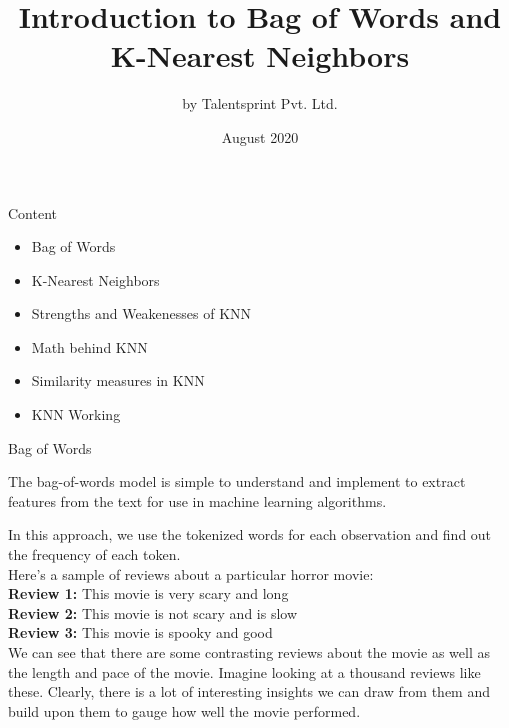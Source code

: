\documentclass{beamer}
\title{Introduction to Bag of Words and K-Nearest Neighbors}
\author{by Talentsprint Pvt. Ltd.}
\date{August 2020}
\begin{document}
\maketitle
\begin{frame}{Content}
	\begin{itemize}
		\item Bag of Words
		\item K-Nearest Neighbors
		\item Strengths and Weakenesses of KNN
		\item Math behind KNN
		\item Similarity measures in KNN
		\item KNN Working
	\end{itemize}
\end{frame}

\begin{frame}{Bag of Words}
\begin{flushleft}
	The bag-of-words model is simple to understand and implement to extract features from the text for use in machine learning algorithms.
\vspace{10pt}

In this approach, we use the tokenized words for each observation and find out the frequency of each token.\\
\vspace{10pt}
Here’s a sample of reviews about a particular horror movie:\\
\vspace{10pt}
\textbf{Review 1:} This movie is very scary and long \\
\textbf{Review 2:} This movie is not scary and is slow \\
\textbf{Review 3:} This movie is spooky and good \\
\vspace{10pt}
We can see that there are some contrasting reviews about the movie as well as the length and pace of the movie. Imagine looking at a thousand reviews like these. Clearly, there is a lot of interesting insights we can draw from them and build upon them to gauge how well the movie performed.
\end{flushleft}
\end{frame}
\end{document}
